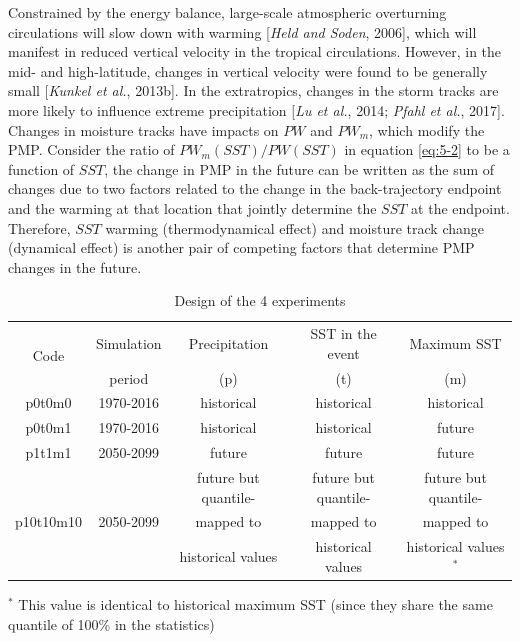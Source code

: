 Constrained by the energy balance, large-scale atmospheric overturning circulations will slow down with warming [\textit{Held and Soden}, 2006], which will manifest in reduced vertical velocity in the tropical circulations. However, in the mid- and high-latitude, changes in vertical velocity were found to be generally small [\textit{Kunkel et al.}, 2013b]. In the extratropics, changes in the storm tracks are more likely to influence extreme precipitation [\textit{Lu et al.}, 2014; \textit{Pfahl et al.}, 2017]. Changes in moisture tracks have impacts on $PW$ and $PW_m$, which modify the PMP. Consider the ratio of $PW_{m}(SST)/PW(SST)$ in equation \ref{eq:5-2} to be a function of $SST$, the change in PMP in the future can be written as the sum of changes due to two factors related to the change in the back-trajectory endpoint and the warming at that location that jointly determine the $SST$ at the endpoint. Therefore, $SST$ warming (thermodynamical effect) and moisture track change (dynamical effect) is another pair of competing factors that determine PMP changes in the future.

\begin{table}[htbp]
	\centering
	\caption{Design of the 4 experiments}
	\begin{threeparttable}
		\begin{tabular}{ccccc}
			\hline
			\multirow{2}{*}{Code}  &  Simulation  &  Precipitation & SST in the event & Maximum SST\\
			                       &  period      &  (p)           & (t)              & (m)        \\
			\hline
			p0t0m0    &  1970-2016   & historical  & historical & historical\\
			p0t0m1    &  1970-2016   & historical  & historical & future\\
			p1t1m1    &  2050-2099   & future      & future     & future\\
			          &              & future but quantile- & future but quantile- & future but quantile- \\
			p10t10m10 &  2050-2099   & mapped to            & mapped to            & mapped to\\
			          &              & historical values    & historical values    & historical values$^{*}$\\ 
			\hline
		\end{tabular}
		\begin{tablenotes}
			\small
			\item $^{*}$ This value is identical to historical maximum SST (since they share the same quantile of 100\% in the statistics)
		\end{tablenotes}
	\end{threeparttable}
	\label{table:5-2}
\end{table}

